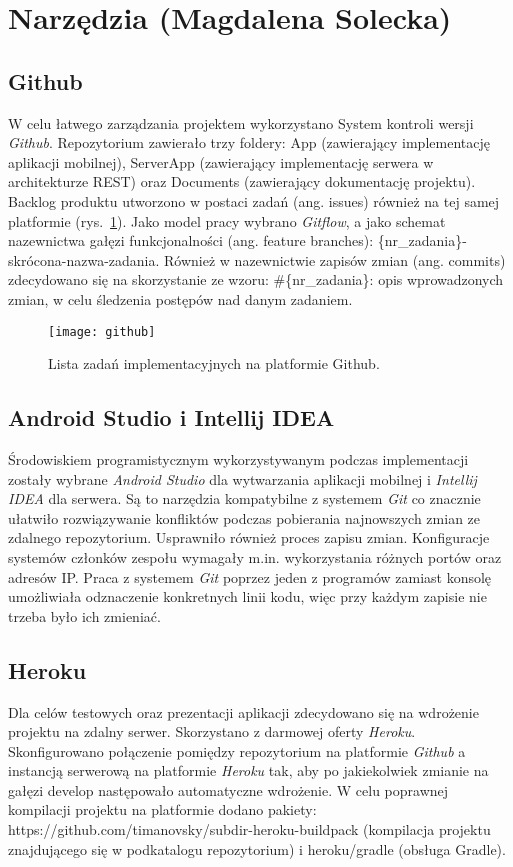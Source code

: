 \section{Narzędzia (Magdalena Solecka)}
\subsection{Github}
\par W celu łatwego zarządzania projektem wykorzystano System kontroli wersji \textit{Github}\cite{github}. Repozytorium zawierało trzy foldery: App (zawierający implementację aplikacji mobilnej), ServerApp (zawierający implementację serwera w architekturze REST) oraz Documents (zawierający dokumentację projektu). Backlog produktu utworzono w postaci zadań (ang. issues) również na tej samej platformie (rys.~\ref{fig:github}).  Jako model pracy wybrano \textit{Gitflow}, a jako schemat nazewnictwa gałęzi funkcjonalności (ang. feature branches): \{nr\_zadania\}-skrócona-nazwa-zadania. Również w nazewnictwie zapisów zmian (ang. commits) zdecydowano się na skorzystanie ze wzoru: \#\{nr\_zadania\}: opis wprowadzonych zmian, w celu śledzenia postępów nad danym zadaniem.

\begin{figure}[h]
\centering
\texttt{[image: github]}
\caption{Lista zadań implementacyjnych na platformie Github.}
\label{fig:github}
\end{figure}
\FloatBarrier

\subsection{Android Studio i Intellij IDEA}
\par Środowiskiem programistycznym wykorzystywanym podczas implementacji zostały wybrane \textit{Android Studio} dla wytwarzania aplikacji mobilnej i \textit{Intellij IDEA} dla serwera. Są to narzędzia kompatybilne z systemem \textit{Git} co znacznie ułatwiło rozwiązywanie konfliktów podczas pobierania najnowszych zmian ze zdalnego repozytorium. Usprawniło również proces zapisu zmian. Konfiguracje systemów członków zespołu wymagały m.in. wykorzystania różnych portów oraz adresów IP. Praca z systemem \textit{Git} poprzez jeden z programów zamiast konsolę umożliwiała odznaczenie konkretnych linii kodu, więc przy każdym zapisie nie trzeba było ich zmieniać.

\subsection{Heroku}
\par Dla celów testowych oraz prezentacji aplikacji zdecydowano się na wdrożenie projektu na zdalny serwer. Skorzystano z darmowej oferty \textit{Heroku}. Skonfigurowano połączenie pomiędzy repozytorium na platformie \textit{Github} a instancją serwerową na platformie \textit{Heroku} tak, aby po jakiekolwiek zmianie na gałęzi develop następowało automatyczne wdrożenie. W celu poprawnej kompilacji projektu na platformie dodano pakiety: https://github.com/timanovsky/subdir-heroku-buildpack (kompilacja projektu znajdującego się w podkatalogu repozytorium) i heroku/gradle (obsługa Gradle).
